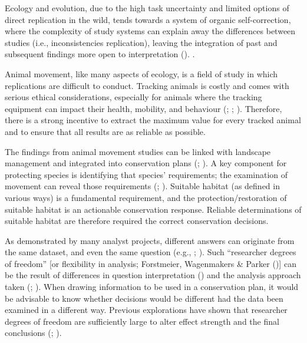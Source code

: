 \documentclass[10pt,a4paper]{article}
\begin{document}
Ecology and evolution, due to the high task uncertainty and limited options of direct replication in the wild, tends towards a system of organic self-correction, where the complexity of study systems can explain away the differences between studies (i.e., inconsistencies replication), leaving the integration of past and subsequent findings more open to interpretation (). .

Animal movement, like many aspects of ecology, is a field of study in which replications are difficult to conduct.
Tracking animals is costly and comes with serious ethical considerations, especially for animals where the tracking equipment can impact their health, mobility, and behaviour (; ; ).
Therefore, there is a strong incentive to extract the maximum value for every tracked animal and to ensure that all results are as reliable as possible.

The findings from animal movement studies can be linked with landscape management and integrated into conservation plans (; ).
A key component for protecting species is identifying that species' requirements; the examination of movement can reveal those requirements (; ).
Suitable habitat (as defined in various ways) is a fundamental requirement, and the protection/restoration of suitable habitat is an actionable conservation response.
Reliable determinations of suitable habitat are therefore required the correct conservation decisions.

As demonstrated by many analyst projects, different answers can originate from the same dataset, and even the same question (e.g., ; ).
Such ``researcher degrees of freedom'' {[}or flexibility in analysis; Forstmeier, Wagenmakers \& Parker (){]} can be the result of differences in question interpretation () and the analysis approach taken (; ).
When drawing information to be used in a conservation plan, it would be advisable to know whether decisions would be different had the data been examined in a different way.
Previous explorations have shown that researcher degrees of freedom are sufficiently large to alter effect strength and the final conclusions (; ).
\end{document}
